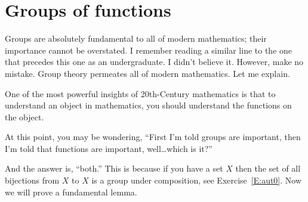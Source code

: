 \documentclass{ximera}
\begin{document}

\section{Groups of functions}

Groups are absolutely fundamental to all of modern mathematics; their
importance cannot be overstated. I remember reading a similar line to
the one that precedes this one as an undergraduate. I didn't believe
it. However, make no mistake. Group theory permeates all of modern
mathematics. Let me explain.

One of the most powerful insights of 20th-Century mathematics is that
to understand an object in mathematics, you should understand the
functions on the object.

At this point, you may be wondering, ``First I'm told groups are
important, then I'm told that functions are important, well\dots which
is it?''

And the answer is, ``both.'' This is because if you have a set $X$
then the set of all bijections from $X$ to $X$ is a group under
composition, see Exercise~\ref{E:aut0}. Now we will prove a
fundamental lemma.
\end{document}
